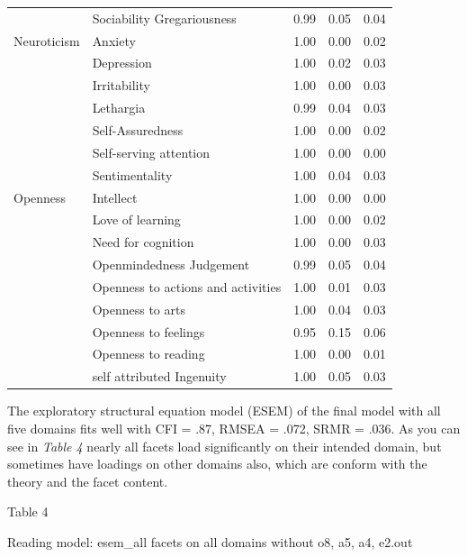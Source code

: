 \documentclass[,man,floatsintext]{apa6}
\theoremstyle{definition}
\theoremstyle{definition}
\theoremstyle{definition}
\theoremstyle{remark}
\begin{document}
\begin{table}[ht]
\begin{tabular}{llrrr}
   & Sociability Gregariousness & 0.99 & 0.05 & 0.04 \\ 
  Neuroticism & Anxiety & 1.00 & 0.00 & 0.02 \\ 
   & Depression & 1.00 & 0.02 & 0.03 \\ 
   & Irritability & 1.00 & 0.00 & 0.03 \\ 
   & Lethargia & 0.99 & 0.04 & 0.03 \\ 
   & Self-Assuredness & 1.00 & 0.00 & 0.02 \\ 
   & Self-serving attention & 1.00 & 0.00 & 0.00 \\ 
   & Sentimentality & 1.00 & 0.04 & 0.03 \\ 
  Openness & Intellect & 1.00 & 0.00 & 0.00 \\ 
   & Love of learning & 1.00 & 0.00 & 0.02 \\ 
   & Need for cognition & 1.00 & 0.00 & 0.03 \\ 
   & Openmindedness Judgement & 0.99 & 0.05 & 0.04 \\ 
   & Openness to actions and activities & 1.00 & 0.01 & 0.03 \\ 
   & Openness to arts & 1.00 & 0.04 & 0.03 \\ 
   & Openness to feelings & 0.95 & 0.15 & 0.06 \\ 
   & Openness to reading & 1.00 & 0.00 & 0.01 \\ 
   & self attributed Ingenuity & 1.00 & 0.05 & 0.03 \\ 
   \hline
\end{tabular}
\endgroup
\end{table}

The exploratory structural equation model (ESEM) of the final model with
all five domains fits well with CFI = .87, RMSEA = .072, SRMR = .036. As
you can see in \emph{Table 4} nearly all facets load significantly on
their intended domain, but sometimes have loadings on other domains
also, which are conform with the theory and the facet content.

Table 4

Reading model: esem\_all facets on all domains without o8, a5, a4,
e2.out
\end{document}
